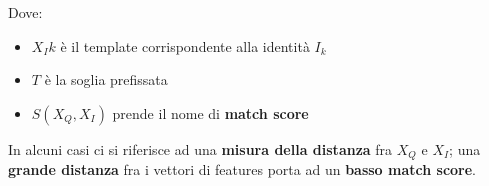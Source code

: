 Dove:
\begin{itemize}
    \item $X_Ik$ è il template corrispondente alla identità $I_k$
    \item $T$ è la soglia prefissata
    \item $S(X_Q, X_I)$ prende il nome di \textbf{match score}
\end{itemize}

In alcuni casi ci si riferisce ad una \textbf{misura della distanza} fra
$X_Q$ e $X_I$; una \textbf{grande distanza} fra i vettori di features porta ad un \textbf{basso match score}.





